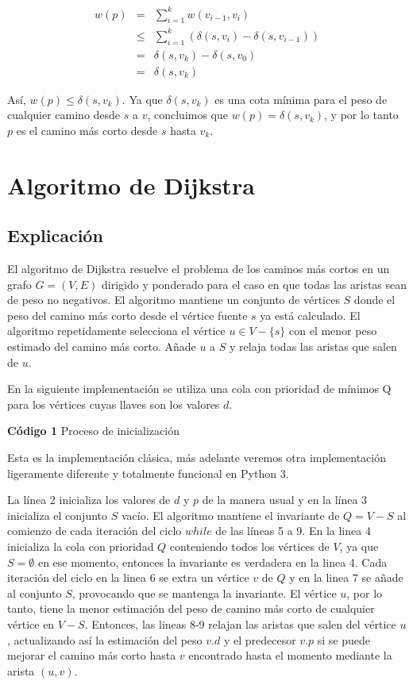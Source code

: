 \documentclass[12pt]{article}
\newcommand{\nl}{\vspace{0.3cm}}
\begin{document}
\begin{eqnarray*}
	w(p) & = & \sum_{i=1}^{k} w(v_{i-1}, v_i) \\
	& \leqslant & \sum_{i=1}^{k} (\delta(s, v_i) - \delta(s, v_{i-1})) \\
	& = & \delta(s, v_k) - \delta(s, v_0) \\
	& = & \delta(s, v_k)
\end{eqnarray*}

Así, $w(p) \leqslant \delta(s, v_k)$. Ya que $\delta(s, v_k)$ es una cota mínima para el peso de cualquier camino desde $s$ a $v$, concluimos que $w(p) = \delta(s, v_k)$, y por lo tanto $p$ es el camino más corto desde $s$ hasta $v_k$.

\section{Algoritmo de Dijkstra}

\subsection{Explicación}

El algoritmo de Dijkstra resuelve el problema de los caminos más cortos en un grafo $G = (V, E)$ dirigido y ponderado para el caso en que todas las aristas sean de peso no negativos. El algoritmo mantiene un conjunto de vértices $S$ donde el peso del camino más corto desde el vértice fuente $s$ ya está calculado. El algoritmo repetidamente selecciona el vértice $u \in V - \{s\}$ con el menor peso estimado del camino más corto. Añade $u$ a $S$ y relaja todas las aristas que salen de $u$.

\nl

En la siguiente implementación se utiliza una cola con prioridad de mínimos Q para los vértices cuyas llaves son los valores $d$.

\textbf{Código 1} Proceso de inicialización



Esta es la implementación clásica, más adelante veremos otra implementación ligeramente diferente y totalmente funcional en Python 3.

\nl

La línea 2 inicializa los valores de $d$ y $p$ de la manera usual y en la línea 3 inicializa el conjunto $S$ vacío. El algoritmo mantiene el invariante de $Q = V - S$ al comienzo de cada iteración del ciclo $while$ de las líneas 5 a 9. En la linea 4 inicializa la cola con prioridad $Q$ conteniendo todos los vértices de $V$, ya que $S = \emptyset$ en ese momento, entonces la invariante es verdadera en la linea 4. Cada iteración del ciclo en la linea 6 se extra un vértice $v$ de $Q$ y en la linea 7 se añade al conjunto $S$, provocando que se mantenga la invariante. El vértice $u$, por lo tanto, tiene la menor estimación del peso de camino más corto de cualquier vértice en $V - S$. Entonces, las lineas 8-9 relajan las aristas que salen del vértice $u$, actualizando así la estimación del peso $v.d$ y el predecesor $v.p$ si se puede mejorar el camino más corto hasta $v$ encontrado hasta el momento mediante la arista $(u, v)$.
\end{document}
